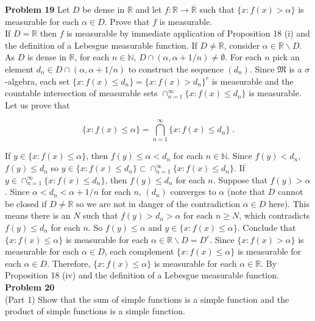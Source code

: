 \documentclass[a4paper]{article}
\begin{document}
{\bf Problem 19} Let $D$ be dense in $\mathbb{R}$ and let $f: \mathbb{R} \rightarrow \overline{\mathbb{R}}$  such that $\{x : f(x) > \alpha\}$ is measurable for each $\alpha \in D$. Prove that $f$ is measurable. \\

If $D = \mathbb{R}$ then $f$ is measurable by immediate application of Proposition 18 (i) and the definition of a Lebesgue measurable function. If $D \neq \mathbb{R}$,  consider $\alpha \in \mathbb{R} \backslash D$. As $D$ is dense in $\mathbb{R}$, for each $n \in \mathbb{N}$, $D \cap (\alpha, \alpha + 1/n) \neq \emptyset$. For each $n$ pick an element $d_n \in D\cap (\alpha, \alpha + 1/n)$ to construct the sequence $(d_n)$. Since $\mathfrak{M}$ is a $\sigma$-algebra, each set $\{x : f(x) \leq d_n\} = \{x : f(x) > d_n\}^c$ is measurable and  the countable intersection of measurable sets $\cap_{n=1}^\infty \{x : f(x) \leq d_n \}$ is measurable. Let us prove that

$$\{x : f(x) \leq \alpha\} = \bigcap_{n=1}^\infty \{x : f(x) \leq d_n \} \;.$$

If $y \in \{x : f(x) \leq \alpha\}$, then $f(y) \leq \alpha< d_n$ for each $n \in \mathbb{N}$. Since $f(y) < d_n$, $f(y) \leq d_n$ so $y \in \{x : f(x) \leq  d_n\}\subset \cap_{n=1}^\infty \{x : f(x) \leq d_n\}$. If $y \in \cap_{n=1}^\infty \{x : f(x) \leq d_n\}$, then $f(y) \leq d_n$ for each $n$. Suppose that $f(y) > \alpha$. Since $\alpha < d_n < \alpha + 1/n$ for each $n$, $(d_n)$ converges to $\alpha$ (note that $D$ cannot be closed if $D \neq \mathbb{R}$ so we are not in danger of the contradiction $\alpha \in D$ here). This means there is an $N$ such that  $f(y) > d_n > \alpha$ for each $n \geq N$, which contradicts $f(y) \leq d_n$ for each $n$. So $f(y) \leq \alpha$ and $y \in \{x: f(x) \leq \alpha\}$. Conclude that $\{x : f(x) \leq \alpha\}$ is measurable for each $\alpha \in \mathbb{R}\backslash D = D^c$.  Since $\{x : f(x) > \alpha\}$ is measurable for each $\alpha \in D$, each complement $\{x : f(x) \leq \alpha\}$ is measurable for each $\alpha \in D$. Therefore, $\{x : f(x) \leq \alpha\}$ is measurable for each $\alpha \in \mathbb{R}$. By Proposition 18 (iv) and the definition of a Lebesgue measurable function. \\

{\bf Problem 20} \\

(Part 1) Show that the sum of simple functions is a simple function and the product of simple functions is a simple function. \\
\end{document}
